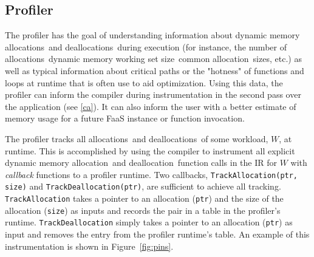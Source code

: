 \documentclass{article}
\def\ALL{allocation}
\def\DALL{deallocation}
\def\ALLS{allocations}
\def\DALLS{deallocations}
\def\DWS{dynamic memory working set size}
\begin{document}
\subsection{Profiler} \label{prof}
The profiler has the goal of understanding information about dynamic memory \ALLS\ and 
\DALLS\ during execution (for instance, the number of \ALLS\, \DWS\, common \ALL\ 
sizes, etc.) as well as typical information about critical paths or the "hotness" of functions and
loops at runtime that is often use to aid optimization. Using this data, the profiler can inform the compiler during 
instrumentation in the second pass over the application (see \ref{ca}). It can also 
inform the user with a better estimate of memory usage for a future FaaS instance or 
function invocation.

The profiler tracks all \ALLS\ and \DALLS\ of some workload, $W$, at runtime. This is 
accomplished by using the compiler to instrument all explicit dynamic memory \ALL\ and \DALL\ function 
calls in the IR for $W$ with \textit{callback} functions to a profiler runtime.
Two callbacks, \texttt{TrackAllocation(ptr, size)} and \texttt{TrackDeallocation(ptr)}, are 
sufficient to achieve all tracking. \texttt{TrackAllocation} takes a pointer to an allocation (\texttt{ptr}) and 
the size of the allocation (\texttt{size}) as inputs and records the pair in a table in the 
profiler's runtime. \texttt{TrackDeallocation} simply takes a pointer to an allocation (\texttt{ptr}) as
input and removes the entry from the profiler runtime's table. An example of this 
instrumentation is shown in Figure~\ref{fig:pins}.
\end{document}
